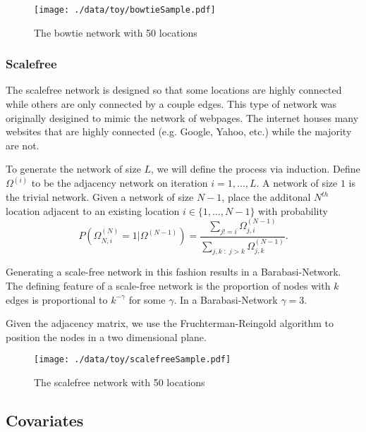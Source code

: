 \documentclass[11pt]{article}
\begin{document}
\begin{figure}[htb]
\centering
\texttt{[image: ./data/toy/bowtieSample.pdf]}
\caption{\label{fig:bowtie50}The bowtie network with 50 locations}
\end{figure}


\subsubsection{Scalefree}
\label{sec-3-1-6}

The scalefree network is designed so that some locations are highly
connected while others are only connected by a couple edges.  This
type of network was originally desigined to mimic the network of
webpages.  The internet houses many websites that are highly connected
(e.g. Google, Yahoo, etc.) while the majority are not.

To generate the network of size $L$, we will define the process via
induction.  Define $\Omega^{(i)}$ to be the adjacency network on
iteration $i = 1,\ldots,L$.  A network of size $1$ is the trivial
network.  Given a network of size $N-1$, place the additonal $N^{th}$
location adjacent to an existing location $i \in \lbrace
    1,\ldots,N-1\rbrace$ with probability
\begin{equation*}
P(\Omega^{(N)}_{N,i} = 1 | \Omega^{(N-1)}) = 
\frac{\sum_{j!=i} \Omega^{(N-1)}_{j,i}}{\sum_{j,k \;:\; j > k} \Omega^{(N-1)}_{j,k}}.
\end{equation*}

Generating a scale-free network in this fashion results in a
Barabasi-Network.  The defining feature of a scale-free network is the
proportion of nodes with $k$ edges is proportional to $k^{-\gamma}$
for some $\gamma$.  In a Barabasi-Network $\gamma = 3$.

Given the adjacency matrix, we use the Fruchterman-Reingold algorithm
to position the nodes in a two dimensional plane.


\begin{figure}[htb]
\centering
\texttt{[image: ./data/toy/scalefreeSample.pdf]}
\caption{\label{fig:scalefree50}The scalefree network with 50 locations}
\end{figure}




\subsection{Covariates}
\label{sec-3-2}
\end{document}
